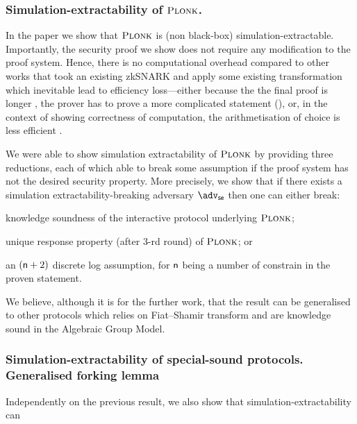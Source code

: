 \documentclass[runningheads,11pt]{llncs}
\begin{document}
	\subsubsection*{Simulation-extractability of $\textsc{Plonk}$.}
	In the paper we show that $\textsc{Plonk}$ is (non black-box) simulation-extractable. Importantly, the security proof we show does not require any modification to the proof system. 
	Hence, there is no computational overhead compared to other works that took an existing zkSNARK and apply some existing transformation which inevitable lead to efficiency loss---either because the the final proof is longer \cite{EPRINT:BowGab18}, the prover has to prove a more complicated statement (\cite{ASIACCS:DerSla18,EPRINT:AbdRamSla20}), or, in the context of showing correctness of computation, the arithmetisation of choice is less efficient \cite{C:GroMal17}.
	
	We were able to show simulation extractability of $\textsc{Plonk}$ by providing three reductions, each of which able to break some assumption if the proof system has not the desired security property. 
	More precisely, we show that if there exists a simulation extractability-breaking adversary $\advse$ then one can either break: 
	\begin{compactenum}
		\item \label{it:ks} knowledge soundness of the interactive protocol underlying $\textsc{Plonk}$; 
		\item \label{it:dlog} unique response property (after $3$-rd round) of $\textsc{Plonk}$; or 
		\item \label{it:ur} an $(\mathsf{n} + 2)$ discrete log assumption, for $\mathsf{n}$ being a number of constrain in the proven statement.
	\end{compactenum}
	
	\medskip
	We believe, although it is for the further work, that the result can be generalised to other protocols which relies on Fiat--Shamir transform and are knowledge sound in the Algebraic Group Model.
	
	\subsubsection*{Simulation-extractability of special-sound protocols. Generalised forking lemma}
	Independently on the previous result, we also show that simulation-extractability can 
	
	
	
\end{document}
